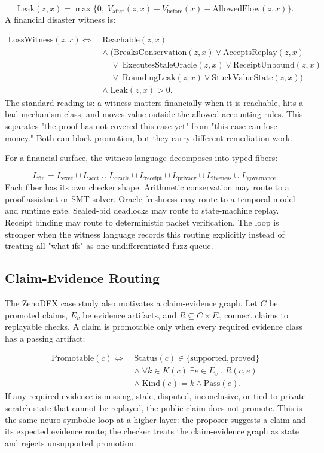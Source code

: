 \documentclass[11pt]{article}
\begin{document}
\[
\mathrm{Leak}(z,x)
=
\max\{0,\;V_{\mathrm{after}}(z,x)-V_{\mathrm{before}}(x)
-\mathrm{AllowedFlow}(z,x)\}.
\]
A financial disaster witness is:

\[
\begin{aligned}
\mathrm{LossWitness}(z,x)\Longleftrightarrow\;&
\mathrm{Reachable}(z,x)\\
&\wedge\;(\mathrm{BreaksConservation}(z,x)
\vee \mathrm{AcceptsReplay}(z,x)\\
&\quad\vee\;\mathrm{ExecutesStaleOracle}(z,x)
\vee \mathrm{ReceiptUnbound}(z,x)\\
&\quad\vee\;\mathrm{RoundingLeak}(z,x)
\vee \mathrm{StuckValueState}(z,x))\\
&\wedge\;\mathrm{Leak}(z,x)>0.
\end{aligned}
\]
The standard reading is: a witness matters financially when it is reachable, hits a bad mechanism class, and moves value outside the allowed accounting rules. This separates "the proof has not covered this case yet" from "this case can lose money." Both can block promotion, but they carry different remediation work.

For a financial surface, the witness language decomposes into typed fibers:

\[
L_{\mathrm{fin}} =
L_{\mathrm{exec}}\cup L_{\mathrm{acct}}\cup L_{\mathrm{oracle}}
\cup L_{\mathrm{receipt}}\cup L_{\mathrm{privacy}}
\cup L_{\mathrm{liveness}}\cup L_{\mathrm{governance}}.
\]
Each fiber has its own checker shape. Arithmetic conservation may route to a proof assistant or SMT solver. Oracle freshness may route to a temporal model and runtime gate. Sealed-bid deadlocks may route to state-machine replay. Receipt binding may route to deterministic packet verification. The loop is stronger when the witness language records this routing explicitly instead of treating all "what ifs" as one undifferentiated fuzz queue.

\subsection{Claim-Evidence Routing}
The ZenoDEX case study also motivates a claim-evidence graph. Let $C$ be promoted claims, $E_v$ be evidence artifacts, and $R\subseteq C\times E_v$ connect claims to replayable checks. A claim is promotable only when every required evidence class has a passing artifact:

\[
\begin{aligned}
\mathrm{Promotable}(c)\Longleftrightarrow\;&
\mathrm{Status}(c)\in\{\mathrm{supported},\mathrm{proved}\}\\
&\wedge\;\forall k\in K(c)\;\exists e\in E_v\;.\;R(c,e)\\
&\wedge\;\mathrm{Kind}(e)=k\wedge\mathrm{Pass}(e).
\end{aligned}
\]
If any required evidence is missing, stale, disputed, inconclusive, or tied to private scratch state that cannot be replayed, the public claim does not promote. This is the same neuro-symbolic loop at a higher layer: the proposer suggests a claim and its expected evidence route; the checker treats the claim-evidence graph as state and rejects unsupported promotion.
\end{document}
